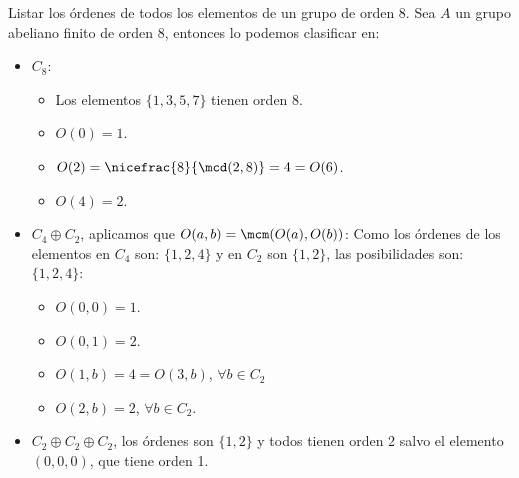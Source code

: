 \begin{ejemplo} %
    Listar los órdenes de todos los elementos de un grupo de orden 8.
    Sea $A$ un grupo abeliano finito de orden $8$, entonces lo podemos clasificar en:
    \begin{itemize}
        \item $C_8$:
            \begin{itemize}
                \item Los elementos $\{1,3,5,7\}$ tienen orden 8.
                \item $O(0) = 1$.
                \item $O(2) = \nicefrac{8}{\mcd(2,8)} = 4 = O(6)$.
                \item $O(4) = 2$.
            \end{itemize}
        \item $C_4\oplus C_2$, aplicamos que $O(a,b) = \mcm(O(a), O(b))$:
            Como los órdenes de los elementos en $C_4$ son: $\{1,2,4\}$ y en $C_2$ son $\{1,2\}$, las posibilidades son: $\{1,2,4\}$:
            \begin{itemize}
                \item $O(0,0) = 1$.
                \item $O(0,1) = 2$.
                \item $O(1,b) = 4 = O(3,b)$, $\forall b\in C_2$
                \item $O(2,b) = 2 $, $\forall b\in C_2$.
            \end{itemize}
        \item $C_2\oplus C_2\oplus C_2$, los órdenes son $\{1,2\}$ y todos tienen orden 2 salvo el elemento $(0,0,0)$, que tiene orden 1.
    \end{itemize}
\end{ejemplo}

